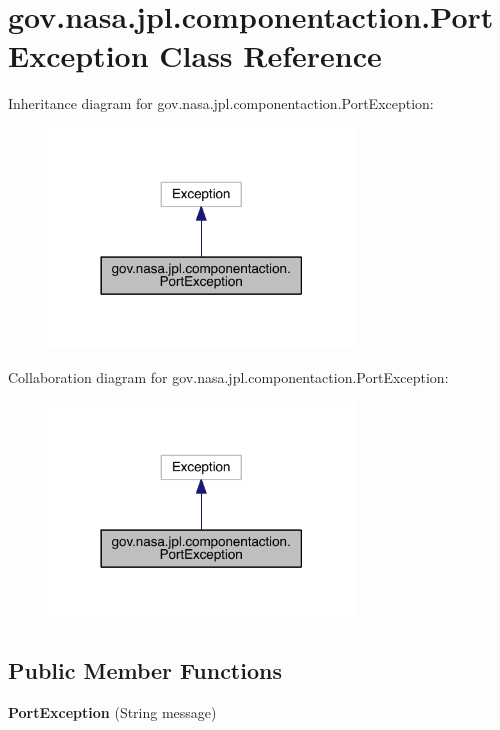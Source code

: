\section{gov.\+nasa.\+jpl.\+componentaction.\+Port\+Exception Class Reference}
\label{classgov_1_1nasa_1_1jpl_1_1componentaction_1_1_port_exception}


Inheritance diagram for gov.\+nasa.\+jpl.\+componentaction.\+Port\+Exception\+:
\nopagebreak
\begin{figure}[H]
\begin{center}
\leavevmode
\includegraphics[width=230pt]{classgov_1_1nasa_1_1jpl_1_1componentaction_1_1_port_exception__inherit__graph}
\end{center}
\end{figure}


Collaboration diagram for gov.\+nasa.\+jpl.\+componentaction.\+Port\+Exception\+:
\nopagebreak
\begin{figure}[H]
\begin{center}
\leavevmode
\includegraphics[width=230pt]{classgov_1_1nasa_1_1jpl_1_1componentaction_1_1_port_exception__coll__graph}
\end{center}
\end{figure}
\subsection*{Public Member Functions}
\begin{DoxyCompactItemize}
\item 
{\bf Port\+Exception} (String message)
\end{DoxyCompactItemize}
